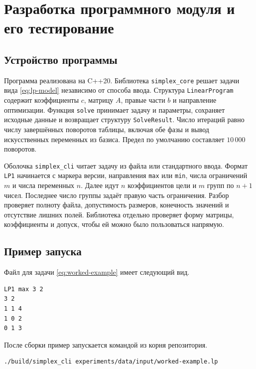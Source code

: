 \section{Разработка программного модуля и его тестирование}
\label{sec:implementation}

\subsection{Устройство программы}

Программа реализована на C++20. Библиотека \texttt{simplex\_core}
решает задачи вида \eqref{eq:lp-model} независимо от способа ввода.
Структура \texttt{LinearProgram} содержит коэффициенты \(c\), матрицу \(A\),
правые части \(b\) и направление оптимизации. Функция \texttt{solve}
принимает задачу и параметры, сохраняет исходные данные и возвращает
структуру \texttt{SolveResult}. Число итераций равно числу завершённых
поворотов таблицы, включая обе фазы и вывод искусственных переменных из
базиса. Предел по умолчанию составляет \(10\,000\) поворотов.

Оболочка \texttt{simplex\_cli} читает задачу из файла или стандартного ввода.
Формат \texttt{LP1} начинается с маркера версии, направления
\texttt{max} или \texttt{min}, числа ограничений \(m\) и числа переменных \(n\).
Далее идут \(n\) коэффициентов цели и \(m\) групп по \(n+1\) чисел. Последнее
число группы задаёт правую часть ограничения. Разбор проверяет полноту
файла, допустимость размеров, конечность значений и отсутствие лишних
полей. Библиотека отдельно проверяет форму матрицы, коэффициенты и допуск,
чтобы ей можно было пользоваться напрямую.

\subsection{Пример запуска}

Файл для задачи \eqref{eq:worked-example} имеет следующий вид.

\begin{lstlisting}[basicstyle=\ttfamily\small]
LP1 max 3 2
3 2
1 1 4
1 0 2
0 1 3
\end{lstlisting}

После сборки пример запускается командой из корня репозитория.

\begin{lstlisting}[basicstyle=\ttfamily\small,breaklines=true]
./build/simplex_cli experiments/data/input/worked-example.lp
\end{lstlisting}

